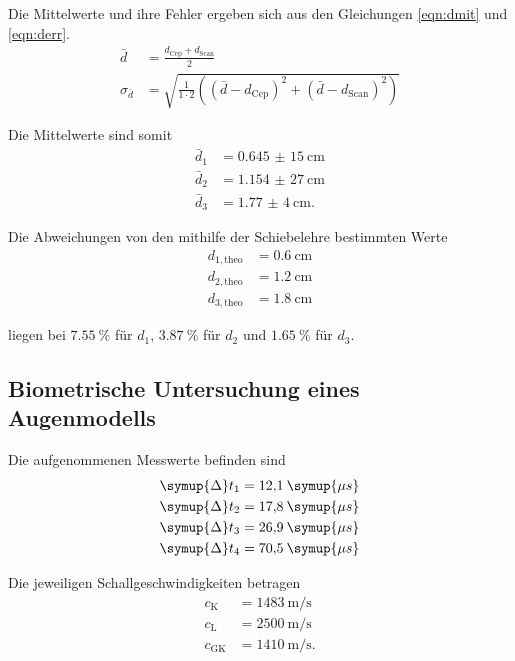 Die Mittelwerte und ihre Fehler ergeben sich aus den Gleichungen \eqref{eqn:dmit} und \eqref{eqn:derr}.
\begin{align}
  \bar{d} &= \frac{d_\text{Cep} + d_\text{Scan}}{2} \label{eqn:dmit} \\
  \sigma_{\bar{d}} &= \sqrt{\frac{1}{1 \cdot 2}  \left((\bar{d}-d_\text{Cep})^2+(\bar{d}-d_\text{Scan})^2 \right)} \label{eqn:derr}
\end{align}

Die Mittelwerte sind somit
\begin{align*}
  \bar{d}_1 &= \SI{0,645(15)}{\cm} \\
  \bar{d}_2 &= \SI{1,154(27)}{\cm} \\
  \bar{d}_3 &= \SI{1,77(4)}{\cm}.
\end{align*}

Die Abweichungen von den mithilfe der Schiebelehre bestimmten Werte
\begin{align*}
  d_{1, \text{theo}} &= \SI{0,6}{\cm} \\
  d_{2, \text{theo}} &= \SI{1,2}{\cm} \\
  d_{3, \text{theo}} &= \SI{1,8}{\cm}
\end{align*}

liegen bei $\SI{7,55}{\%}$ für $ d_1$, $\SI{3,87}{\%}$ für $d_2$ und $\SI{1,65}{\%}$ für $d_3$.

\subsection{Biometrische Untersuchung eines Augenmodells}

Die aufgenommenen Messwerte befinden sind
\begin{align*}
  \symup{\Delta}t_1 = 12,\!1 \: \symup{\mu s} \\
  \symup{\Delta}t_2 = 17,\!8 \: \symup{\mu s} \\
  \symup{\Delta}t_3 = 26,\!9 \: \symup{\mu s} \\
  \symup{\Delta}t_4 = 70,\!5 \: \symup{\mu s} \\
\end{align*}

Die jeweiligen Schallgeschwindigkeiten betragen
\begin{align*}
  c_\text{K} &= \SI{1483}{\m \per \s} \\
  c_\text{L} &= \SI{2500}{\m \per \s} \\
  c_\text{GK} &= \SI{1410}{\m \per \s}.
\end{align*}

